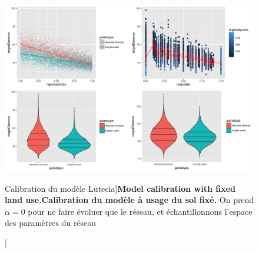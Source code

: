 \begin{figure}
	\includegraphics[width=\linewidth]{Figures/Final/7-3-3-fig-lutecia-calib.jpg}
	\caption[Calibration of the Lutecia model][Calibration du modèle Lutecia]{\textbf{Model calibration with fixed land use.}\label{fig:lutecia:calib}}{\textbf{Calibration du modèle à usage du sol fixé.} On prend $\alpha = 0$ pour ne faire évoluer que le réseau, et échantillonnons l'espace des paramètres du réseau \label{fig:lutecia:calib}}
\end{figure}























